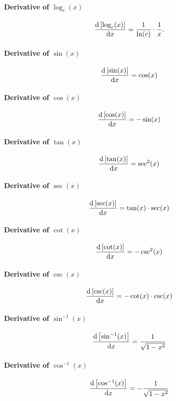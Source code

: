 \documentclass{article}
\begin{document}
\paragraph{Derivative of $\log_{c}(x)$}
\[\diff{\left[\log_{c}(x)\right]}{x}=\frac{1}{\ln(c)}\cdot \frac{1}{x}.\]

\paragraph{Derivative of $\sin(x)$}
\[\diff{\left[\sin(x)\right]}{x}=\cos(x)\]

\paragraph{Derivative of $\cos(x)$}
\[\diff{\left[\cos(x)\right]}{x}=-\sin(x)\]

\paragraph{Derivative of $\tan(x)$}
\[\diff{\left[\tan(x)\right]}{x}=\sec^2(x)\]

\paragraph{Derivative of $\sec(x)$}
\[\diff{\left[\sec(x)\right]}{x}=\tan(x)\cdot \sec(x)\]

\paragraph{Derivative of $\cot(x)$}
\[\diff{\left[\cot(x)\right]}{x}=-\csc^2(x)\]

\paragraph{Derivative of $\csc(x)$}
\[\diff{\left[\csc(x)\right]}{x}=-\cot(x)\cdot \csc(x)\]

\paragraph{Derivative of $\sin^{-1}(x)$}
\[\diff{\left[\sin^{-1}(x)\right]}{x}=\frac{1}{\sqrt{1-x^2}}\]

\paragraph{Derivative of $\cos^{-1}(x)$}
\[\diff{\left[\cos^{-1}(x)\right]}{x}=-\frac{1}{\sqrt{1-x^2}}\]
\end{document}
